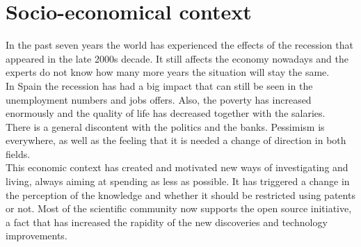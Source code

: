 \section{Socio-economical context}

In the past seven years the world has experienced the effects of the recession that appeared in the late 2000s decade. It still affects the economy nowadays and the experts do not know how many more years the situation will stay the same. \\

In Spain the recession has had a big impact that can still be seen in the unemployment numbers and jobs offers. Also, the poverty has increased enormously and the quality of life has decreased together with the salaries.  
\\

There is a general discontent with the politics and the banks. Pessimism is everywhere, as well as the feeling that it is needed a change of direction in both fields. 
\\


This economic context has created and motivated new ways of investigating and living, always aiming at spending as less as possible. It has triggered a change in the perception of the knowledge and whether it should be restricted using patents or not. Most of the scientific community now supports the open source initiative, a fact that has increased the rapidity of the new discoveries and technology improvements. 

